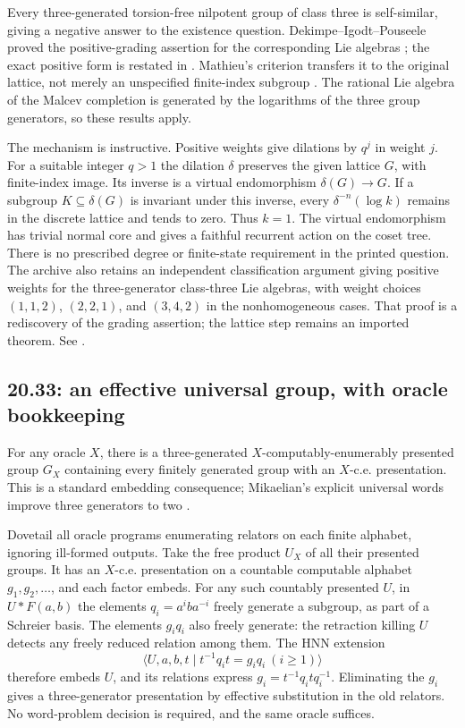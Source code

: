 Every three-generated torsion-free nilpotent group of class
three is self-similar, giving a negative answer to the
existence question. Dekimpe--Igodt--Pouseele proved the
positive-grading assertion for the corresponding Lie
algebras \cite{dekimpe-igodt-pouseele}; the exact positive
form is restated in \cite{dekimpe-dere}.
Mathieu's criterion transfers it to the original lattice,
not merely an unspecified finite-index subgroup
\cite[Proposition~6]{mathieu}.
The rational Lie algebra of the Malcev completion is
generated by the logarithms of the three group generators,
so these results apply.

The mechanism is instructive. Positive weights give dilations
by \(q^j\) in weight \(j\). For a suitable integer \(q>1\)
the dilation \(\delta\) preserves the given lattice \(G\),
with finite-index image. Its inverse is a virtual
endomorphism \(\delta(G)\to G\).
If a subgroup \(K\subseteq\delta(G)\) is invariant under
this inverse, every \(\delta^{-n}(\log k)\) remains in the
discrete lattice and tends to zero. Thus \(k=1\).
The virtual endomorphism has trivial normal core and gives
a faithful recurrent action on the coset tree.
There is no prescribed degree or finite-state requirement
in the printed question.
The archive also retains an independent classification
argument giving positive weights for the three-generator
class-three Lie algebras, with weight choices
\((1,1,2)\), \((2,2,1)\), and \((3,4,2)\) in the
nonhomogeneous cases. That proof is a rediscovery of the
grading assertion; the lattice step remains an imported
theorem. See .

\subsection{20.33: an effective universal group, with oracle bookkeeping}
\label{prior:20.33}

For any oracle \(X\), there is a three-generated
\(X\)-computably-enumerably presented group \(G_X\) containing
every finitely generated group with an \(X\)-c.e. presentation.
This is a standard embedding consequence; Mikaelian's
explicit universal words improve three generators to two
\cite{mikaelian}.

Dovetail all oracle programs enumerating relators on each
finite alphabet, ignoring ill-formed outputs. Take the
free product \(U_X\) of all their presented groups.
It has an \(X\)-c.e. presentation on a countable computable
alphabet \(g_1,g_2,\ldots\), and each factor embeds.
For any such countably presented \(U\), in \(U*F(a,b)\)
the elements \(q_i=a^iba^{-i}\) freely generate a subgroup,
as part of a Schreier basis. The elements \(g_iq_i\) also
freely generate: the retraction killing \(U\) detects
any freely reduced relation among them.
The HNN extension
\[
 \langle U,a,b,t\mid t^{-1}q_it=g_iq_i\ (i\ge1)\rangle
\]
therefore embeds \(U\), and its relations express
\(g_i=t^{-1}q_itq_i^{-1}\).
Eliminating the \(g_i\) gives a three-generator presentation
by effective substitution in the old relators.
No word-problem decision is required, and the same oracle
suffices.


